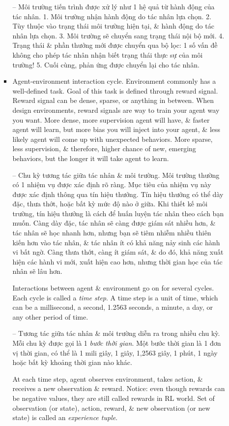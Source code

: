 \documentclass{article}
\begin{document}
\begin{itemize}
\begin{itemize}
\begin{itemize}
            -- {\sf Môi trường tiến trình được xử lý như 1 hệ quả từ hành động của tác nhân.} 1. Môi trường nhận hành động do tác nhân lựa chọn. 2. Tùy thuộc vào trạng thái môi trường hiện tại, \& hành động do tác nhân lựa chọn. 3. Môi trường sẽ chuyển sang trạng thái nội bộ mới. 4. Trạng thái \& phần thưởng mới được chuyển qua bộ lọc: 1 số vấn đề không cho phép tác nhân nhận biết trạng thái thực sự của môi trường! 5. Cuối cùng, phản ứng được chuyển lại cho tác nhân.
            \item {\sf Agent-environment interaction cycle.} Environment commonly has a well-defined task. Goal of this task is defined through reward signal. Reward signal can be dense, sparse, or anything in between. When design environments, reward signals are way to train your agent way you want. More dense, more supervision agent will have, \& faster agent will learn, but more bias you will inject into your agent, \& less likely agent will come up with unexpected behaviors. More sparse, less supervision, \& therefore, higher chance of new, emerging behaviors, but the longer it will take agent to learn.

            -- {\sf Chu kỳ tương tác giữa tác nhân \& môi trường.} Môi trường thường có 1 nhiệm vụ được xác định rõ ràng. Mục tiêu của nhiệm vụ này được xác định thông qua tín hiệu thưởng. Tín hiệu thưởng có thể dày đặc, thưa thớt, hoặc bất kỳ mức độ nào ở giữa. Khi thiết kế môi trường, tín hiệu thưởng là cách để huấn luyện tác nhân theo cách bạn muốn. Càng dày đặc, tác nhân sẽ càng được giám sát nhiều hơn, \& tác nhân sẽ học nhanh hơn, nhưng bạn sẽ tiêm nhiễm nhiều thiên kiến hơn vào tác nhân, \& tác nhân ít có khả năng nảy sinh các hành vi bất ngờ. Càng thưa thớt, càng ít giám sát, \& do đó, khả năng xuất hiện các hành vi mới, xuất hiện cao hơn, nhưng thời gian học của tác nhân sẽ lâu hơn.

            Interactions between agent \& environment go on for several cycles. Each cycle is called a {\it time step}. A time step is a unit of time, which can be a millisecond, a second, 1.2563 seconds, a minute, a day, or any other period of time.

            -- Tương tác giữa tác nhân \& môi trường diễn ra trong nhiều chu kỳ. Mỗi chu kỳ được gọi là 1 {\it bước thời gian}. Một bước thời gian là 1 đơn vị thời gian, có thể là 1 mili giây, 1 giây, 1,2563 giây, 1 phút, 1 ngày hoặc bất kỳ khoảng thời gian nào khác.

            At each time step, agent observes environment, takes action, \& receives a new observation \& reward. Notice: even though rewards can be negative values, they are still called rewards in RL world. Set of observation (or state), action, reward, \& new observation (or new state) is called an {\it experience tuple}.


\end{itemize}
\end{itemize}
\end{itemize}
\end{document}

